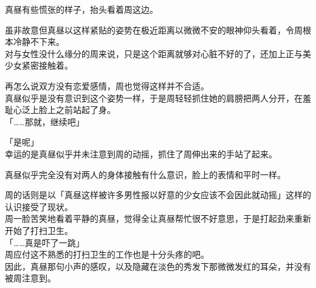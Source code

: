 真昼有些慌张的样子，抬头看着周这边。

虽非故意但真昼以这样紧贴的姿势在极近距离以微微不安的眼神仰头看着，令周根本冷静不下来。\\

对与女性没什么缘分的周来说，只是这个距离就够对心脏不好的了，还加上正与美少女紧密接触着。

再怎么说双方没有恋爱感情，周也觉得这样并不合适。\\

真昼似乎是没有意识到这个姿势一样，于是周轻轻抓住她的肩膀把两人分开，在羞耻心泛上脸上之前站起了身。\\

「……那就，继续吧」

「是呢」\\

幸运的是真昼似乎并未注意到周的动摇，抓住了周伸出来的手站了起来。

真昼似乎完全没有对两人的身体接触有什么意识，脸上的表情和平时一样。

周的话则是以「真昼这样被许多男性报以好意的少女应该不会因此就动摇」这样的认识接受了现状。\\

周一脸苦笑地看着平静的真昼，觉得全让真昼帮忙很不好意思，于是打起劲来重新开始了打扫卫生。\\

「……真是吓了一跳」\\

周应付这不熟悉的打扫卫生的工作也是十分头疼的吧。\\

因此，真昼那句小声的感叹，以及隐藏在淡色的秀发下那微微发红的耳朵，并没有被周注意到。

